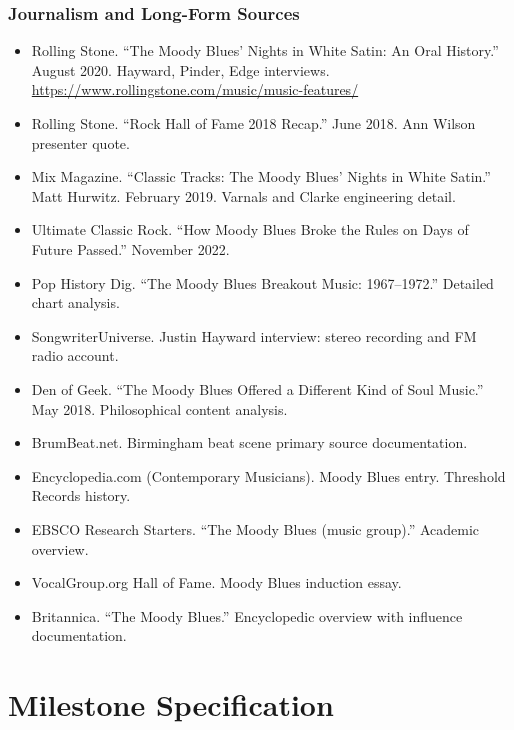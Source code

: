 \documentclass[11pt,letterpaper]{article}
\newcommand{\stageheader}[2]{%
  \noindent\colorbox{#2}{\makebox[\textwidth][l]{%
    \textcolor{white}{\bfseries\sffamily\hspace{6pt}#1\hspace{6pt}}}}%
  \vspace{0.5em}\par%
}
\begin{document}
\subsubsection{Journalism and Long-Form Sources}
\begin{itemize}[leftmargin=*]
  \item Rolling Stone. ``The Moody Blues' Nights in White Satin: An Oral History.'' August 2020. Hayward, Pinder, Edge interviews. \url{https://www.rollingstone.com/music/music-features/}
  \item Rolling Stone. ``Rock Hall of Fame 2018 Recap.'' June 2018. Ann Wilson presenter quote.
  \item Mix Magazine. ``Classic Tracks: The Moody Blues' Nights in White Satin.'' Matt Hurwitz. February 2019. Varnals and Clarke engineering detail.
  \item Ultimate Classic Rock. ``How Moody Blues Broke the Rules on Days of Future Passed.'' November 2022.
  \item Pop History Dig. ``The Moody Blues Breakout Music: 1967--1972.'' Detailed chart analysis.
  \item SongwriterUniverse. Justin Hayward interview: stereo recording and FM radio account.
  \item Den of Geek. ``The Moody Blues Offered a Different Kind of Soul Music.'' May 2018. Philosophical content analysis.
  \item BrumBeat.net. Birmingham beat scene primary source documentation.
  \item Encyclopedia.com (Contemporary Musicians). Moody Blues entry. Threshold Records history.
  \item EBSCO Research Starters. ``The Moody Blues (music group).'' Academic overview.
  \item VocalGroup.org Hall of Fame. Moody Blues induction essay.
  \item Britannica. ``The Moody Blues.'' Encyclopedic overview with influence documentation.
\end{itemize}

\newpage

\stageheader{STAGE 3 --- MISSION PACKAGE}{tertiary}

\section{Milestone Specification}
\end{document}
